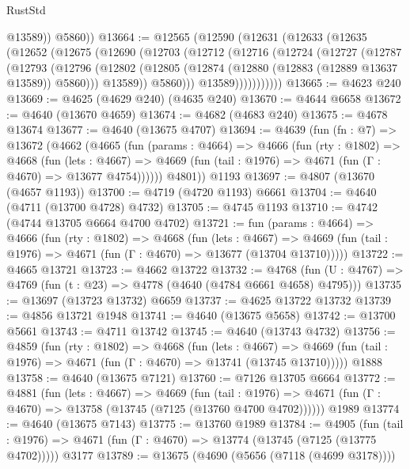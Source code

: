 \begin{lexlean}{RustStd}
\begin{coremodule}
            @13589))
        @5860))
@13664 := @12565
    (@12590
      (@12631
        (@12633
          (@12635
            (@12652
              (@12675
                (@12690
                  (@12703
                    (@12712
                      (@12716
                        (@12724
                          (@12727
                            (@12787
                              (@12793
                                (@12796
                                  (@12802
                                    (@12805 (@12874 (@12880 (@12883 (@12889 @13637 @13589)) @5860)))
                                    @13589))
                                @5860)))
                          @13589)))))))))))
@13665 := @4623 @240
@13669 := @4625 (@4629 @240) (@4635 @240)
@13670 := @4644 @6658
@13672 := @4640 (@13670 @4659)
@13674 := @4682 (@4683 @240)
@13675 := @4678 @13674
@13677 := @4640 (@13675 @4707)
@13694 := @4639
    (fun (fn : @7) =>
    @13672
      (@4662
        (@4665
          (fun (params : @4664) =>
          @4666
            (fun (rty : @1802) =>
            @4668
              (fun (lets : @4667) =>
              @4669 (fun (tail : @1976) => @4671 (fun (Γ : @4670) => @13677 @4754))))))
        @4801))
    @1193
@13697 := @4807 (@13670 (@4657 @1193))
@13700 := @4719 (@4720 @1193) @6661
@13704 := @4640 (@4711 (@13700 @4728) @4732)
@13705 := @4745 @1193
@13710 := @4742 (@4744 @13705 @6664 @4700 @4702)
@13721 := fun (params : @4664) =>
  @4666
    (fun (rty : @1802) =>
    @4668
      (fun (lets : @4667) =>
      @4669 (fun (tail : @1976) => @4671 (fun (Γ : @4670) => @13677 (@13704 @13710)))))
@13722 := @4665 @13721
@13723 := @4662 @13722
@13732 := @4768
    (fun (U : @4767) => @4769 (fun (t : @23) => @4778 (@4640 (@4784 @6661 @4658) @4795)))
@13735 := @13697 (@13723 @13732) @6659
@13737 := @4625 @13722 @13732
@13739 := @4856 @13721 @1948
@13741 := @4640 (@13675 @5658)
@13742 := @13700 @5661
@13743 := @4711 @13742
@13745 := @4640 (@13743 @4732)
@13756 := @4859
    (fun (rty : @1802) =>
    @4668
      (fun (lets : @4667) =>
      @4669 (fun (tail : @1976) => @4671 (fun (Γ : @4670) => @13741 (@13745 @13710)))))
    @1888
@13758 := @4640 (@13675 @7121)
@13760 := @7126 @13705 @6664
@13772 := @4881
    (fun (lets : @4667) =>
    @4669
      (fun (tail : @1976) =>
      @4671 (fun (Γ : @4670) => @13758 (@13745 (@7125 (@13760 @4700 @4702))))))
    @1989
@13774 := @4640 (@13675 @7143)
@13775 := @13760 @1989
@13784 := @4905
    (fun (tail : @1976) => @4671 (fun (Γ : @4670) => @13774 (@13745 (@7125 (@13775 @4702)))))
    @3177
@13789 := @13675 (@4690 (@5656 (@7118 (@4699 @3178))))

\end{coremodule}
\end{lexlean}

